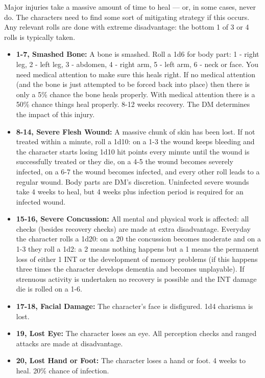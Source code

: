 \documentclass[letterpaper,12pt]{article}
\begin{document}
Major injuries take a massive amount of time to heal --- or, in some cases, never do. The characters need to find some sort of mitigating strategy if this occurs. Any relevant rolls are done with extreme disadvantage: the bottom 1 of 3 or 4 rolls is typically taken.

\begin{itemize}
\item \textbf{1-7, Smashed Bone:} A bone is smashed. Roll a 1d6 for body part: 1 - right leg, 2 - left leg, 3 - abdomen, 4 - right arm, 5 - left arm, 6 - neck or face. You need medical attention to make sure this heals right. If no medical attention (and the bone is just attempted to be forced back into place) then there is only a 5\% chance the bone heals properly. With medical attention there is a 50\% chance things heal properly. 8-12 weeks recovery. The DM determines the impact of this injury.
\item \textbf{8-14, Severe Flesh Wound:} A massive chunk of skin has been lost. If not treated within a minute, roll a 1d10: on a 1-3 the wound keeps bleeding and the character starts losing 1d10 hit points every minute until the wound is successfully treated or they die, on a 4-5 the wound becomes severely infected, on a 6-7 the wound becomes infected, and every other roll leads to a regular wound. Body parts are DM's discretion. Uninfected severe wounds take 4 weeks to heal, but 4 weeks plus infection period is required for an infected wound. 
\item \textbf{15-16, Severe Concussion:} All mental and physical work is affected: all checks (besides recovery checks) are made at extra disadvantage. Everyday the character rolls a 1d20: on a 20 the concussion becomes moderate and on a 1-3 they roll a 1d2: a 2 means nothing happens but a 1 means the permanent loss of either 1 INT or the development of memory problems (if this happens three times the character develops dementia and becomes unplayable). If strenuous activity is undertaken no recovery is possible and the INT damage die is rolled on a 1-6. 
\item \textbf{17-18, Facial Damage:} The character's face is disfigured. 1d4 charisma is lost.
\item \textbf{19, Lost Eye:} The character loses an eye. All perception checks and ranged attacks are made at disadvantage.
\item \textbf{20, Lost Hand or Foot:} The character loses a hand or foot. 4 weeks to heal. 20\% chance of infection.  
\end{itemize} 
\end{document}
